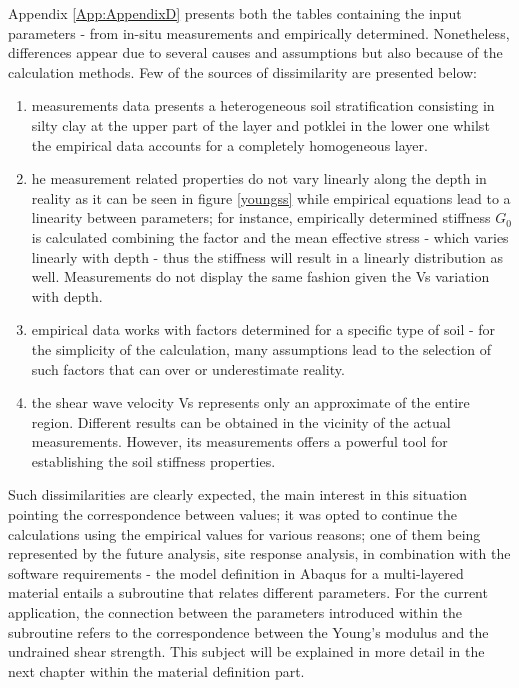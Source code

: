 \documentclass[12pt,a4paper]{report}
\begin{document}
Appendix \ref{App:AppendixD} presents both the tables containing the input parameters - from in-situ measurements and empirically determined. Nonetheless, differences appear due to several causes and assumptions but also because of the calculation methods. Few of the sources of dissimilarity are presented below:
\begin{enumerate}
	\item measurements data presents a heterogeneous soil stratification consisting in silty clay at the upper part of the layer and potklei in the lower one whilst the empirical data accounts for a completely homogeneous layer.
	\item he measurement related properties do not vary linearly along the depth in reality as it can be seen in figure \ref{youngss} while empirical equations lead to a linearity between parameters; for instance, empirically determined stiffness $G_0$ is calculated combining the factor and the mean effective stress - which varies linearly with depth - thus the stiffness will result in a linearly distribution as well. Measurements do not display the same fashion given the Vs variation with depth.
	\item empirical data works with factors determined for a specific type of soil - for the simplicity of the calculation, many assumptions lead to the selection of such factors that can over or underestimate reality.
	\item the shear wave velocity Vs represents only an approximate of the entire region. Different results can be obtained in the vicinity of the actual measurements. However, its measurements offers a powerful tool for establishing the soil stiffness properties. 
\end{enumerate}

Such dissimilarities are clearly expected, the main interest in this situation pointing the \mbox{correspondence} between values; it was opted to continue the calculations using the empirical values for various reasons; one of them being represented by the future analysis, site response analysis, in combination with the software requirements - the model definition in Abaqus for a multi-layered material entails a subroutine that relates different parameters. For the current application, the connection between the parameters introduced within the subroutine refers to the correspondence between the Young's modulus and the undrained shear strength. This subject will be explained in more detail in the next chapter within the material definition part. 
\end{document}
